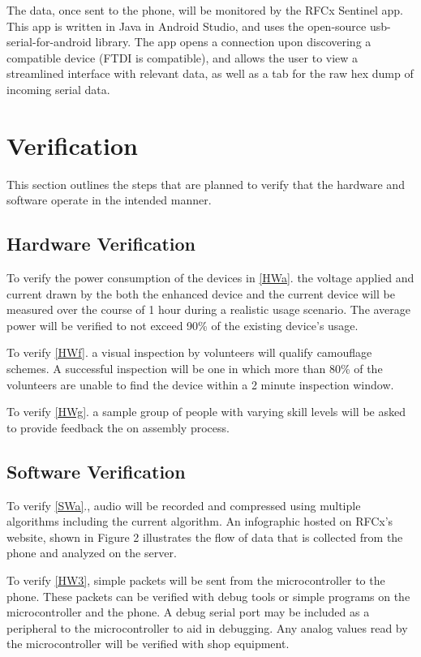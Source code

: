 \documentclass{article}
\numberwithin{figure}{section}
\numberwithin{equation}{section}
\begin{document}
{The data, once sent to the phone, will be monitored by the RFCx Sentinel app. This app is written in Java in Android Studio, and uses the open-source usb-serial-for-android library. The app opens a connection upon discovering a compatible device (FTDI is compatible), and allows the user to view a streamlined interface with relevant data, as well as a tab for the raw hex dump of incoming serial data.

\section{Verification} \label{sect:verification}
This section outlines the steps that are planned to verify that the hardware and software operate in the intended manner.
\subsection{Hardware Verification} \label{sect:hardwareverification}
To verify the power consumption of the devices in \ref{HWa}. the voltage applied and current drawn by the both the enhanced device and the current device will be measured over the course of 1 hour during a realistic usage scenario. The average power will be verified to not exceed 90\% of the existing device’s usage.

To verify \ref{HWf}. a visual inspection by volunteers will qualify camouflage schemes. A successful inspection will be one in which more than 80\% of the volunteers are unable to find the device within a 2 minute inspection window.

To verify \ref{HWg}. a sample group of people with varying skill levels will be asked to provide feedback the on assembly process.

\subsection{Software Verification} \label{sect:softwareverification}
To verify \ref{SWa}., audio will be recorded and compressed using multiple algorithms including the current algorithm. An infographic hosted on RFCx’s website, shown in Figure 2 illustrates the flow of data that is collected from the phone and analyzed on the server.

To verify \ref{HW3}, simple packets will be sent from the microcontroller to the phone. These packets can be verified with debug tools or simple programs on the microcontroller and the phone. A debug serial port may be included as a peripheral to the microcontroller to aid in debugging. Any analog values read by the microcontroller will be verified with shop equipment.

}
\end{document}
